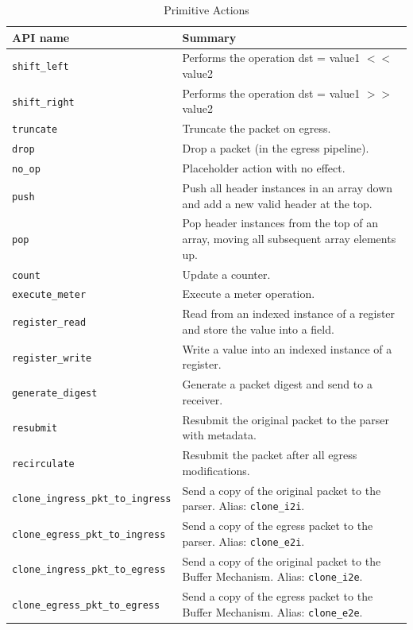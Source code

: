 \documentclass[12pt]{article}
\begin{document}
\begin{table}[H]
\begin{center}
\begin{tabular}{| l | p{} |} \hline
\textbf{API name} &
\textbf{Summary} \\ \hline
\texttt{shift_left} &
Performs the operation dst = value1 $<<$ value2 \\ \hline
\texttt{shift_right} &
Performs the operation dst = value1 $>>$ value2 \\ \hline
\texttt{truncate} &
Truncate the packet on egress. \\ \hline
\texttt{drop} &
Drop a packet (in the egress pipeline). \\ \hline
\texttt{no_op} &
Placeholder action with no effect. \\ \hline
\texttt{push} &
Push all header instances in an array down and add a new valid header at the top. \\ \hline
\texttt{pop} &
Pop header instances from the top of an array, moving all subsequent array elements up. \\ \hline
\texttt{count} &
Update a counter. \\ \hline
\texttt{execute_meter} &
Execute a meter operation. \\ \hline
\texttt{register_read} &
{Read from an indexed instance of a register and store the value into a field.} \\ \hline
\texttt{register_write} &
{Write a value into an indexed instance of a register. }\\ \hline
\texttt{generate_digest} &
Generate a packet digest and send to a receiver. \\ \hline
\texttt{resubmit} &
Resubmit the original packet to the parser with metadata. \\ \hline
\texttt{recirculate} &
Resubmit the packet after all egress modifications. \\ \hline
\texttt{clone_ingress_pkt_to_ingress} &
Send a copy of the original packet to the parser. Alias: \texttt{clone_i2i}. \\ \hline
\texttt{clone_egress_pkt_to_ingress} &
Send a copy of the egress packet to the parser. Alias: \texttt{clone_e2i}. \\ \hline
\texttt{clone_ingress_pkt_to_egress} &
Send a copy of the original packet to the Buffer Mechanism. Alias: \texttt{clone_i2e}. \\ \hline
\texttt{clone_egress_pkt_to_egress} &
Send a copy of the egress packet to the Buffer Mechanism. Alias: \texttt{clone_e2e}. \\ \hline
\end{tabular}
\end{center}
\caption{Primitive Actions}
\label{tab:primitiveactions}
\end{table}
\end{document}
